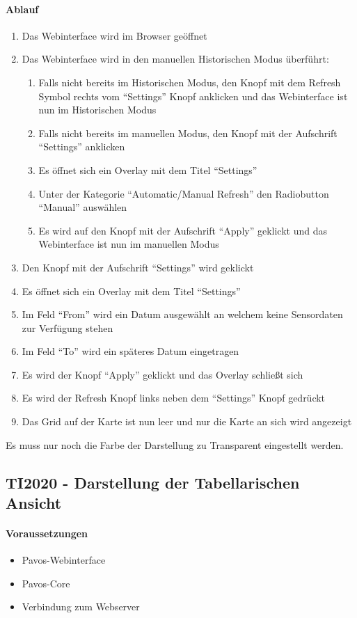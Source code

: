 \paragraph{Ablauf}
\begin{enumerate}
\item Das Webinterface wird im Browser geöffnet
\item Das Webinterface wird in den manuellen Historischen Modus überführt:
\begin{enumerate}
\item Falls nicht bereits im Historischen Modus, den Knopf mit dem Refresh Symbol rechts vom ``Settings'' Knopf anklicken und das Webinterface ist nun im Historischen Modus
\item Falls nicht bereits im manuellen Modus, den Knopf mit der Aufschrift ``Settings'' anklicken
\item Es öffnet sich ein Overlay mit dem Titel ``Settings''
\item Unter der Kategorie ``Automatic/Manual Refresh'' den Radiobutton ``Manual'' auswählen
\item Es wird auf den Knopf mit der Aufschrift ``Apply'' geklickt und das Webinterface ist nun im manuellen Modus
\end{enumerate}
\item Den Knopf mit der Aufschrift ``Settings'' wird geklickt
\item Es öffnet sich ein Overlay mit dem Titel ``Settings''
\item Im Feld ``From'' wird ein Datum ausgewählt an welchem keine Sensordaten zur Verfügung stehen
\item Im Feld ``To'' wird ein späteres Datum eingetragen
\item Es wird der Knopf ``Apply'' geklickt und das Overlay schließt sich
\item Es wird der Refresh Knopf links neben dem ``Settings'' Knopf gedrückt
\item Das Grid auf der Karte ist nun leer und nur die Karte an sich wird angezeigt
\end{enumerate}
\szenarioBad

Es muss nur noch die Farbe der Darstellung zu Transparent eingestellt werden.

\subsection{TI2020 - Darstellung der Tabellarischen Ansicht}
\paragraph{Voraussetzungen}
\begin{itemize}
\item Pavos-Webinterface
\item Pavos-Core
\item Verbindung zum Webserver
\end{itemize}
